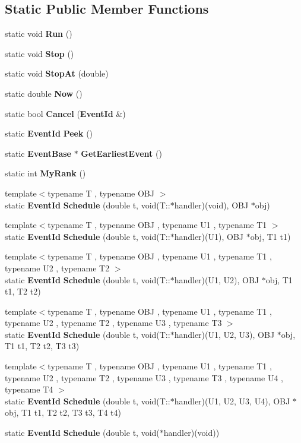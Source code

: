 \subsection*{Static Public Member Functions}
\begin{CompactItemize}
\item 
static void {\bf Run} ()
\item 
static void {\bf Stop} ()
\item 
static void {\bf StopAt} (double)
\item 
static double {\bf Now} ()
\item 
static bool {\bf Cancel} ({\bf EventId} \&)
\item 
static {\bf EventId} {\bf Peek} ()
\item 
static {\bf EventBase} $\ast$ {\bf GetEarliestEvent} ()
\item 
static int {\bf MyRank} ()
\item 
{\footnotesize template$<$typename T , typename OBJ $>$ }\\static {\bf EventId} {\bf Schedule} (double t, void(T::$\ast$handler)(void), OBJ $\ast$obj)
\item 
{\footnotesize template$<$typename T , typename OBJ , typename U1 , typename T1 $>$ }\\static {\bf EventId} {\bf Schedule} (double t, void(T::$\ast$handler)(U1), OBJ $\ast$obj, T1 t1)
\item 
{\footnotesize template$<$typename T , typename OBJ , typename U1 , typename T1 , typename U2 , typename T2 $>$ }\\static {\bf EventId} {\bf Schedule} (double t, void(T::$\ast$handler)(U1, U2), OBJ $\ast$obj, T1 t1, T2 t2)
\item 
{\footnotesize template$<$typename T , typename OBJ , typename U1 , typename T1 , typename U2 , typename T2 , typename U3 , typename T3 $>$ }\\static {\bf EventId} {\bf Schedule} (double t, void(T::$\ast$handler)(U1, U2, U3), OBJ $\ast$obj, T1 t1, T2 t2, T3 t3)
\item 
{\footnotesize template$<$typename T , typename OBJ , typename U1 , typename T1 , typename U2 , typename T2 , typename U3 , typename T3 , typename U4 , typename T4 $>$ }\\static {\bf EventId} {\bf Schedule} (double t, void(T::$\ast$handler)(U1, U2, U3, U4), OBJ $\ast$obj, T1 t1, T2 t2, T3 t3, T4 t4)
\item 
static {\bf EventId} {\bf Schedule} (double t, void($\ast$handler)(void))
\item 

\end{CompactItemize}
